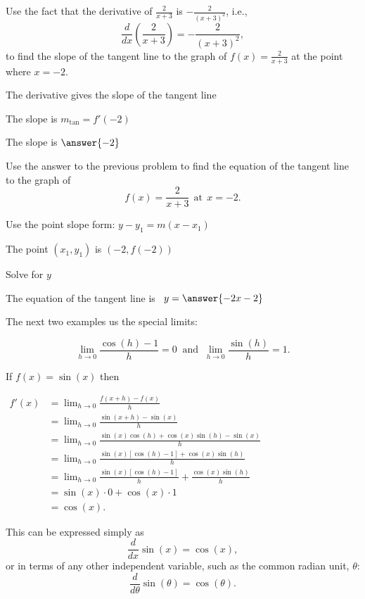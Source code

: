 \documentclass{ximera}
\begin{document}
\begin{problem} %
Use the fact that the derivative of $\frac{2}{x+3}$ is $-\frac{2}{(x+3)^2}$,
i.e., 
\[
\frac{d}{dx}\left(\frac{2}{x+3}\right) = -\frac{2}{(x+3)^2},
\]
to find the slope of the tangent line to the graph of 
$f(x) = \frac{2}{x+3}$ at the point where $x = -2$.\\
\begin{hint}
The derivative gives the slope of the tangent line
\end{hint}
\begin{hint}
The slope is $m_{\text{tan}} = f'(-2)$
\end{hint}
The slope is $\answer{-2}$
\end{problem}




\begin{problem} %
Use the answer to the previous problem to find the equation of the tangent line to the graph of 
\[
f(x) = \frac{2}{x+3} \  \  \text{at} \  \ x=-2.
\]

\begin{hint}
Use the point slope form: $y-y_1 = m(x-x_1)$
\end{hint}
\begin{hint}
The point $(x_1,y_1)$ is $(-2, f(-2))$
\end{hint}
\begin{hint}
Solve for $y$
\end{hint}
The equation of the tangent line is \  $y = \answer{-2x-2}$
\end{problem}


The next two examples us the special limits:

\[\lim_{h \to 0} \frac{\cos(h) -1}{h}=0 \;\;\mbox{and} \;\; \lim_{h \to 0}\frac{\sin(h)}{h} = 1.\]


\begin{example}[example 8]
If $f(x) = \sin(x)$ then
\begin{center}
$\begin{aligned}
f'(x) &= \lim_{h \to 0} \frac{f(x+h)-f(x)}{h} \\[5pt]
&= \lim_{h \to 0} \frac{\sin(x+h) - \sin(x)}{h}\\[5pt]
&=  \lim_{h \to 0} \frac{\sin(x)\cos(h) + \cos(x)\sin(h) - \sin(x)}{h}\\[5pt]
&=  \lim_{h \to 0} \frac{\sin(x)[\cos(h) -1] + \cos(x)\sin(h)}{h}\\[5pt]
&=  \lim_{h \to 0} \frac{\sin(x)[\cos(h) -1]}{h} + \frac{\cos(x)\sin(h)}{h}\\[5pt]
&=  \sin(x) \cdot 0 + \cos(x) \cdot 1 \\[5pt]
&= \cos(x).
\end{aligned}$
\end{center}
This can be expressed simply as
\[
\frac{d}{dx}\sin(x) = \cos(x),
\]
or in terms of any other independent variable, such as the common radian unit, $\theta$:
\[
\frac{d}{d\theta}\sin(\theta) = \cos(\theta).
\]
\end{example}
\end{document}
